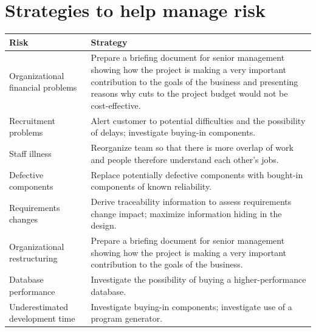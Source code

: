 \section{ Strategies to help manage risk}
\begin{table}[h!]
\centering
\begin{tabular}{ |p{4cm}|p{8cm}|  }
\hline
Risk & Strategy\\
\hline
\hline
Organizational financial problems & Prepare a briefing document for senior management showing how the project is making a very important contribution to the goals of the business and presenting reasons why cuts to the project budget would not be cost-effective.\\
\hline
Recruitment problems & Alert customer to potential difficulties and the possibility of delays; investigate buying-in components.\\
\hline
Staff illness & Reorganize team so that there is more overlap of work and people therefore understand each other’s jobs.\\
\hline
Defective components & Replace potentially defective components with bought-in components of known reliability.\\
\hline
Requirements changes & Derive traceability information to assess requirements change impact; maximize information hiding in the design.\\
\hline
Organizational restructuring & Prepare a briefing document for senior management showing how the project is making a very important contribution to the goals of the business.\\
\hline
Database performance & Investigate the possibility of buying a higher-performance database.\\
\hline
Underestimated development time & Investigate buying-in components; investigate use of a program generator.\\
\hline

\end{tabular}

\label{table:T5_3}
\end{table}

\newpage
